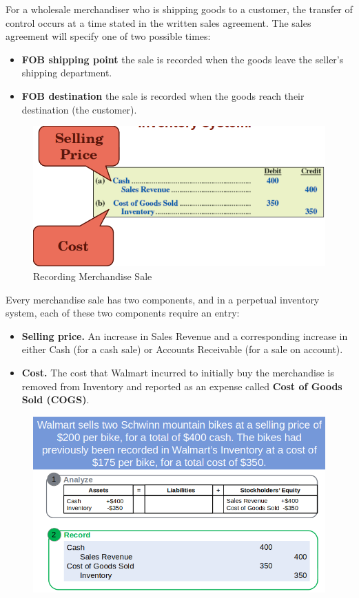 \documentclass[../main.tex]{subfiles}
\begin{document}
	For a wholesale merchandiser who is shipping goods to a customer, the 
	transfer of control occurs at a time stated in the written sales agreement. 
	The sales agreement will specify one of two possible times:
	\begin{itemize}[noitemsep]
		\item \textbf{FOB shipping point} \ie the sale is recorded when the 
		goods leave the seller’s shipping department.
		\item \textbf{FOB destination} \ie the sale is recorded when the goods 
		reach their destination (the customer).
	\end{itemize}
	
	\begin{figure}[ht!]
		\centering
		\includegraphics[width=1\columnwidth]{images/c7/recording_sales_eg.png}
		\caption{Recording Merchandise Sale}
	\end{figure}
	
	
	Every merchandise sale has two components, and in a perpetual inventory 
	system, each of these two components require an entry:
	\begin{itemize}
		\item \textbf{Selling price.} An increase in Sales Revenue and a 
		corresponding increase in either Cash (for a cash sale) or Accounts 
		Receivable (for a sale on account).
		\item \textbf{Cost.} The cost that Walmart incurred to initially buy 
		the merchandise is removed from Inventory and reported as an expense 
		called \textbf{Cost of Goods Sold (COGS)}.
	\end{itemize}
	
	\begin{figure}[ht]
		\centering
		\includegraphics[width=\columnwidth]{images/c7/recording_inventory_sales_eg.png}
	\end{figure}
	
\end{document}
